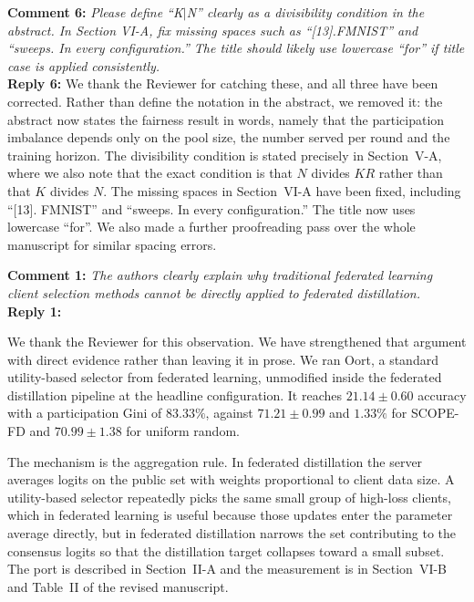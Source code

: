 \documentclass[10pt]{article}
\begin{document}
\noindent
\textbf{Comment 6:} \textit{Please define ``K$|$N'' clearly as a divisibility condition in the abstract. In Section VI-A, fix missing spaces such as ``[13].FMNIST'' and ``sweeps. In every configuration.'' The title should likely use lowercase ``for'' if title case is applied consistently.} \\
\noindent
\textbf{Reply 6:} {We thank the Reviewer for catching these, and all three have been corrected. Rather than define the notation in the abstract, we removed it: the abstract now states the fairness result in words, namely that the participation imbalance depends only on the pool size, the number served per round and the training horizon. The divisibility condition is stated precisely in Section~V-A, where we also note that the exact condition is that $N$ divides $KR$ rather than that $K$ divides $N$. The missing spaces in Section~VI-A have been fixed, including ``[13]. FMNIST'' and ``sweeps. In every configuration.'' The title now uses lowercase ``for''. We also made a further proofreading pass over the whole manuscript for similar spacing errors.}\\


\noindent
\textbf{Comment 1:} \textit{The authors clearly explain why traditional federated learning client selection methods cannot be directly applied to federated distillation.} \\
\noindent
\textbf{Reply 1:} {We thank the Reviewer for this observation. We have strengthened that argument with direct evidence rather than leaving it in prose. We ran Oort, a standard utility-based selector from federated learning, unmodified inside the federated distillation pipeline at the headline configuration. It reaches $21.14 \pm 0.60$ accuracy with a participation Gini of $83.33\%$, against $71.21 \pm 0.99$ and $1.33\%$ for SCOPE-FD and $70.99 \pm 1.38$ for uniform random.

The mechanism is the aggregation rule. In federated distillation the server averages logits on the public set with weights proportional to client data size. A utility-based selector repeatedly picks the same small group of high-loss clients, which in federated learning is useful because those updates enter the parameter average directly, but in federated distillation narrows the set contributing to the consensus logits so that the distillation target collapses toward a small subset. The port is described in Section~II-A and the measurement is in Section~VI-B and Table~II of the revised manuscript.}\\
\end{document}
